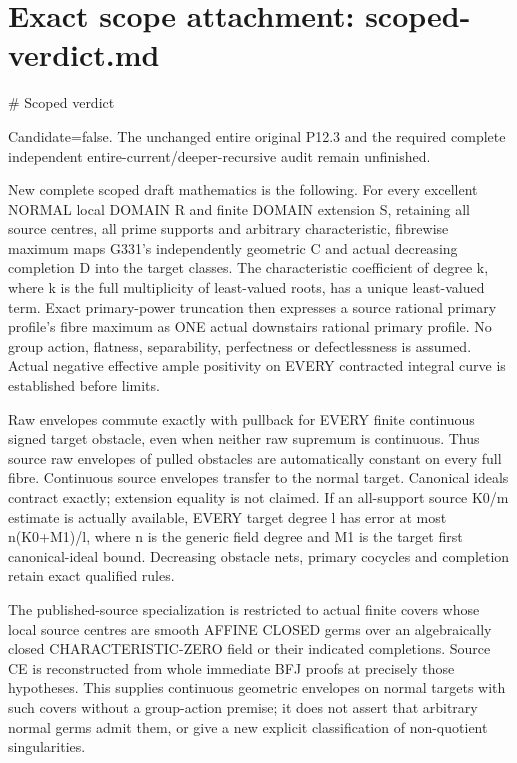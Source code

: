 \documentclass[11pt]{article}
\begin{document}
\section{Exact scope attachment: scoped-verdict.md}
\# Scoped verdict

Candidate=false. The unchanged entire original P12.3 and the required complete independent entire-current/deeper-recursive audit remain unfinished.

New complete scoped draft mathematics is the following. For every excellent NORMAL local DOMAIN R and finite DOMAIN extension S, retaining all source centres, all prime supports and arbitrary characteristic, fibrewise maximum maps G331's independently geometric C and actual decreasing completion D into the target classes. The characteristic coefficient of degree k, where k is the full multiplicity of least-valued roots, has a unique least-valued term. Exact primary-power truncation then expresses a source rational primary profile's fibre maximum as ONE actual downstairs rational primary profile. No group action, flatness, separability, perfectness or defectlessness is assumed. Actual negative effective ample positivity on EVERY contracted integral curve is established before limits.

Raw envelopes commute exactly with pullback for EVERY finite continuous signed target obstacle, even when neither raw supremum is continuous. Thus source raw envelopes of pulled obstacles are automatically constant on every full fibre. Continuous source envelopes transfer to the normal target. Canonical ideals contract exactly; extension equality is not claimed. If an all-support source K0/m estimate is actually available, EVERY target degree l has error at most n(K0+M1)/l, where n is the generic field degree and M1 is the target first canonical-ideal bound. Decreasing obstacle nets, primary cocycles and completion retain exact qualified rules.

The published-source specialization is restricted to actual finite covers whose local source centres are smooth AFFINE CLOSED germs over an algebraically closed CHARACTERISTIC-ZERO field or their indicated completions. Source CE is reconstructed from whole immediate BFJ proofs at precisely those hypotheses. This supplies continuous geometric envelopes on normal targets with such covers without a group-action premise; it does not assert that arbitrary normal germs admit them, or give a new explicit classification of non-quotient singularities.
\end{document}
